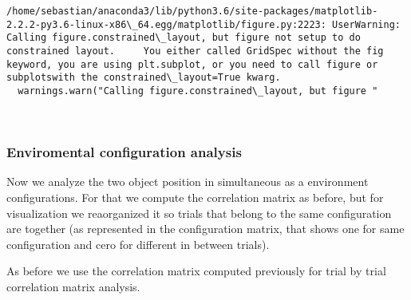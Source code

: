\documentclass[11pt]{article}
\begin{document}
    \begin{Verbatim}[commandchars=\\\{\}]
/home/sebastian/anaconda3/lib/python3.6/site-packages/matplotlib-2.2.2-py3.6-linux-x86\_64.egg/matplotlib/figure.py:2223: UserWarning: Calling figure.constrained\_layout, but figure not setup to do constrained layout.     You either called GridSpec without the fig keyword, you are using plt.subplot, or you need to call figure or subplotswith the constrained\_layout=True kwarg.
  warnings.warn("Calling figure.constrained\_layout, but figure "

    \end{Verbatim}

    \begin{center}
    \end{center}
    { \hspace*{\fill} \\}
    
    \subsubsection{Enviromental configuration
analysis}\label{enviromental-configuration-analysis}

Now we analyze the two object position in simultaneous as a environment
configurations. For that we compute the correlation matrix as before,
but for visualization we reaorganized it so trials that belong to the
same configuration are together (as represented in the configuration
matrix, that shows one for same configuration and cero for different in
between trials).

As before we use the correlation matrix computed previously for trial by
trial correlation matrix analysis.
\end{document}
